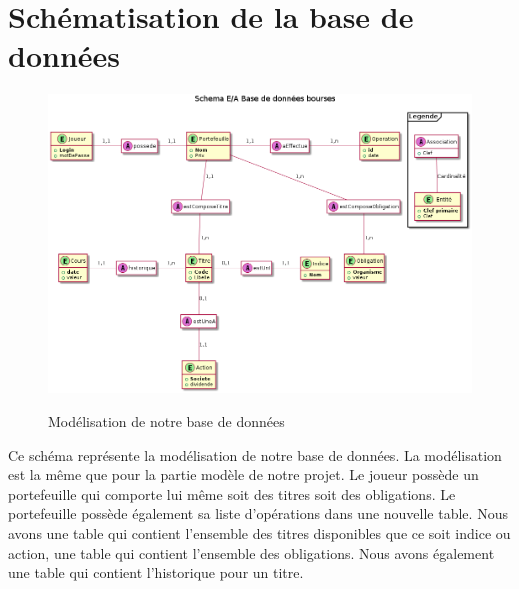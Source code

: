 \section{Schématisation de la base de données}

\begin{figure}[H]
  \center
  \includegraphics[scale=0.4]{../graph/DiagrammeEntiteAssociation.png} \\
  \caption{Modélisation de notre base de données}
\end{figure}

Ce schéma représente la modélisation de notre base de données. La modélisation est la même que pour la partie modèle de notre projet. Le joueur possède un portefeuille qui comporte lui même soit des titres soit des obligations. Le portefeuille possède également sa liste d'opérations dans une nouvelle table. Nous avons une table qui contient l'ensemble des titres disponibles que ce soit indice ou action, une table qui contient l'ensemble des obligations. Nous avons également une table qui contient l'historique pour un titre. 